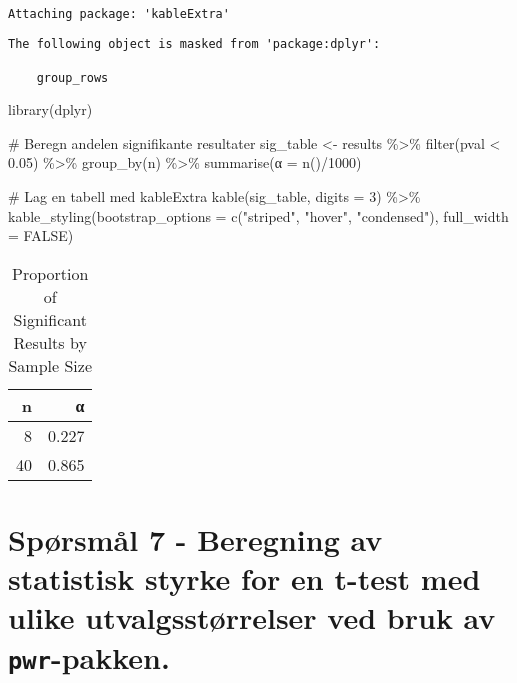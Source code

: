 \documentclass[
  letterpaper,
  DIV=11,
  numbers=noendperiod]{scrreprt}
\newenvironment{Shaded}{\begin{snugshade}}{\end{snugshade}}
\newcommand{\AttributeTok}[1]{\textcolor[rgb]{0.40,0.45,0.13}{#1}}
\newcommand{\CommentTok}[1]{\textcolor[rgb]{0.37,0.37,0.37}{#1}}
\newcommand{\ConstantTok}[1]{\textcolor[rgb]{0.56,0.35,0.01}{#1}}
\newcommand{\DecValTok}[1]{\textcolor[rgb]{0.68,0.00,0.00}{#1}}
\newcommand{\FloatTok}[1]{\textcolor[rgb]{0.68,0.00,0.00}{#1}}
\newcommand{\FunctionTok}[1]{\textcolor[rgb]{0.28,0.35,0.67}{#1}}
\newcommand{\NormalTok}[1]{\textcolor[rgb]{0.00,0.23,0.31}{#1}}
\newcommand{\OtherTok}[1]{\textcolor[rgb]{0.00,0.23,0.31}{#1}}
\newcommand{\SpecialCharTok}[1]{\textcolor[rgb]{0.37,0.37,0.37}{#1}}
\newcommand{\StringTok}[1]{\textcolor[rgb]{0.13,0.47,0.30}{#1}}
\begin{document}
\begin{verbatim}

Attaching package: 'kableExtra'
\end{verbatim}

\begin{verbatim}
The following object is masked from 'package:dplyr':

    group_rows
\end{verbatim}

\begin{Shaded}
\begin{Highlighting}[]
\FunctionTok{library}\NormalTok{(dplyr)}

\CommentTok{\# Beregn andelen signifikante resultater}
\NormalTok{sig\_table }\OtherTok{\textless{}{-}}\NormalTok{ results }\SpecialCharTok{\%\textgreater{}\%}
  \FunctionTok{filter}\NormalTok{(pval }\SpecialCharTok{\textless{}} \FloatTok{0.05}\NormalTok{) }\SpecialCharTok{\%\textgreater{}\%}
  \FunctionTok{group\_by}\NormalTok{(n) }\SpecialCharTok{\%\textgreater{}\%}
  \FunctionTok{summarise}\NormalTok{(}\StringTok{\textasciigrave{}}\AttributeTok{α}\StringTok{\textasciigrave{}} \OtherTok{=} \FunctionTok{n}\NormalTok{()}\SpecialCharTok{/}\DecValTok{1000}\NormalTok{)}

\CommentTok{\# Lag en tabell med kableExtra}
\FunctionTok{kable}\NormalTok{(sig\_table, }\AttributeTok{digits =} \DecValTok{3}\NormalTok{) }\SpecialCharTok{\%\textgreater{}\%}
  \FunctionTok{kable\_styling}\NormalTok{(}\AttributeTok{bootstrap\_options =} \FunctionTok{c}\NormalTok{(}\StringTok{"striped"}\NormalTok{, }\StringTok{"hover"}\NormalTok{, }\StringTok{"condensed"}\NormalTok{), }\AttributeTok{full\_width =} \ConstantTok{FALSE}\NormalTok{)}
\end{Highlighting}
\end{Shaded}

\begin{longtable}[t]{rr}

\caption{\label{tbl-sig}Proportion of Significant Results by Sample
Size}

\tabularnewline

\toprule
n & α\\
\midrule
8 & 0.227\\
40 & 0.865\\
\bottomrule

\end{longtable}

\section{\texorpdfstring{Spørsmål 7 - Beregning av statistisk styrke for
en t-test med ulike utvalgsstørrelser ved bruk av
\texttt{pwr}-pakken.}{Spørsmål 7 - Beregning av statistisk styrke for en t-test med ulike utvalgsstørrelser ved bruk av pwr-pakken.}}\label{spuxf8rsmuxe5l-7---beregning-av-statistisk-styrke-for-en-t-test-med-ulike-utvalgsstuxf8rrelser-ved-bruk-av-pwr-pakken.}
\end{document}
